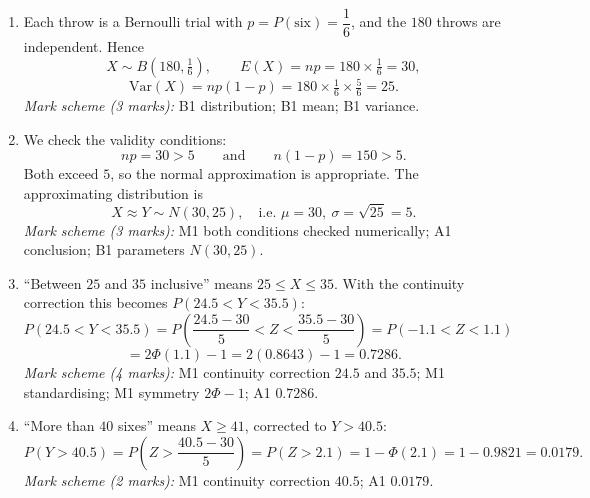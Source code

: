 \documentclass[11pt]{article}
\begin{document}
\begin{corrige}
\begin{enumerate}
\item Each throw is a Bernoulli trial with $p = P(\text{six}) = \dfrac{1}{6}$, and the $180$ throws are independent. Hence
\[
X \sim B\!\left(180, \tfrac{1}{6}\right), \qquad E(X) = np = 180 \times \tfrac{1}{6} = \boxed{30},
\]
\[
\mathrm{Var}(X) = np(1-p) = 180 \times \tfrac{1}{6} \times \tfrac{5}{6} = \boxed{25}.
\]
\emph{Mark scheme (3 marks):} B1 distribution; B1 mean; B1 variance.

\item We check the validity conditions:
\[
np = 30 > 5 \qquad \text{and} \qquad n(1-p) = 150 > 5.
\]
Both exceed $5$, so the normal approximation is appropriate. The approximating distribution is
\[
X \approx Y \sim N(30, 25), \quad \text{i.e. } \mu = 30,\ \sigma = \sqrt{25} = 5.
\]
\emph{Mark scheme (3 marks):} M1 both conditions checked numerically; A1 conclusion; B1 parameters $N(30, 25)$.

\item ``Between $25$ and $35$ inclusive'' means $25 \le X \le 35$. With the continuity correction this becomes $P(24.5 < Y < 35.5)$:
\[
P(24.5 < Y < 35.5) = P\!\left(\frac{24.5 - 30}{5} < Z < \frac{35.5 - 30}{5}\right) = P(-1.1 < Z < 1.1)
\]
\[
= 2\Phi(1.1) - 1 = 2(0.8643) - 1 = \boxed{0.7286}.
\]
\emph{Mark scheme (4 marks):} M1 continuity correction $24.5$ and $35.5$; M1 standardising; M1 symmetry $2\Phi - 1$; A1 $0.7286$.

\item ``More than $40$ sixes'' means $X \ge 41$, corrected to $Y > 40.5$:
\[
P(Y > 40.5) = P\!\left(Z > \frac{40.5 - 30}{5}\right) = P(Z > 2.1) = 1 - \Phi(2.1) = 1 - 0.9821 = \boxed{0.0179}.
\]
\emph{Mark scheme (2 marks):} M1 continuity correction $40.5$; A1 $0.0179$.
\end{enumerate}
\end{corrige}
\end{document}
